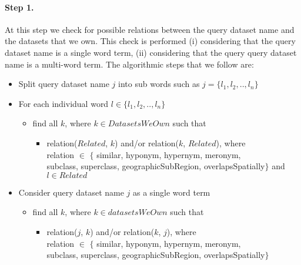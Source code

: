 \documentclass[a4paper,10pt]{article}
\begin{document}
\paragraph{Step 1.} 
At this step we check for possible relations between the query dataset name and the datasets that we own. This check is performed (i) considering 
that the query dataset name is a single word term, (ii) considering that the query query dataset name is a multi-word term. 
The algorithmic steps that we follow are:

\begin{itemize}
 \item Split query dataset name $j$ into sub words such as $j=\{l_1,l_2,..,l_n\}$
\item For each individual word $l \in \{l_1,l_2,..,l_n\}$ 

	\begin{itemize}
	\item find all $k$, where $k \in DatasetsWeOwn$ such that
		\begin{itemize}
		\item relation($Related$, $k$) and/or relation($k$, $Related$), where \\ relation $\in$ $\{$ similar, hyponym, hypernym, meronym,\\ 
subclass, superclass, geographicSubRegion, overlapsSpatially$\}$ and $l \in Related$
			\end{itemize}
				\end{itemize}
	\item Consider query dataset name $j$ as a single word term
	
		\begin{itemize}
		\item find all 	$k$, where $k \in datasetsWeOwn$ such that	
		\begin{itemize}
		\item relation($j$, $k$) and/or relation($k$, $j$), where \\ relation $\in$ $\{$ similar, hyponym, hypernym, meronym,\\ subclass, superclass, geographicSubRegion, overlapsSpatially$\}$ 
			\end{itemize}
		
		\end{itemize}
	
\end{itemize}
\end{document}
